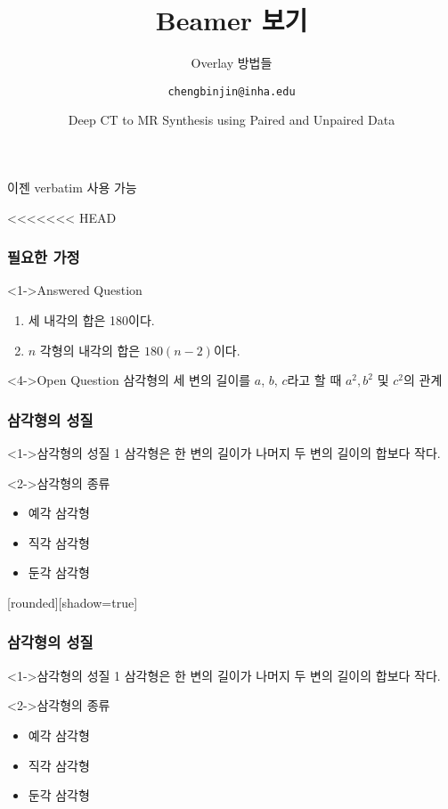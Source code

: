 \documentclass[xcolor=table]{beamer}
\title{Beamer 보기}
\subtitle{Overlay 방법들}
\author[김성빈]{\texttt{chengbinjin@inha.edu}}
\date[\today]{Deep CT to MR Synthesis using Paired and Unpaired Data}
\institute{INHA University}
\begin{document}
\begin{frame}
\titlepage
\end{frame}

\begin{frame}[fragile]
이젠 verbatim 사용 가능
\end{frame}

\begin{frame}[fragile]
\end{frame}

<<<<<<< HEAD
\begin{frame}
\frametitle{필요한 가정}
\begin{block}<1->{Answered Question}
\begin{enumerate}
\item<2-> 세 내각의 합은 180이다.
\item<3-> $n$ 각형의 내각의 합은 $180(n-2)$이다.
\end{enumerate}
\end{block}
\begin{block}<4->{Open Question}
삼각형의 세 변의 길이를 $a$, $b$, $c$라고 할 때 $a^2, b^2$ 및 $c^2$의 관계
\end{block}
\end{frame}

\begin{frame}
\frametitle{삼각형의 성질}
\begin{block}<1->{삼각형의 성질 1}
\alert{삼각형}은 한 변의 길이가 나머지 두 변의 길이의 합보다 작다.
\end{block}

\begin{block}<2->{삼각형의 종류}
\begin{itemize}
\item<2-> 예각 삼각형
\item<3-> 직각 삼각형
\item<4-> 둔각 삼각형
\end{itemize}
\end{block}
\end{frame}

[rounded][shadow=true]

\begin{frame}
\frametitle{삼각형의 성질}
\begin{block}<1->{삼각형의 성질 1}
\alert{삼각형}은 한 변의 길이가 나머지 두 변의 길이의 합보다 작다.
\end{block}

\begin{block}<2->{삼각형의 종류}
\begin{itemize}
\item<2-> 예각 삼각형
\item<3-> 직각 삼각형
\item<4-> 둔각 삼각형
\end{itemize}
\end{block}
\end{frame}
\end{document}
